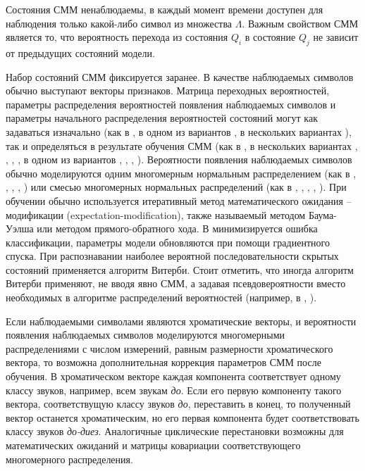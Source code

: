Состояния СММ ненаблюдаемы, в каждый момент времени доступен для наблюдения
только какой-либо символ из множества $\Lambda$. Важным свойством СММ является
то, что вероятность перехода из состояния $Q_i$ в состояние $Q_j$ не зависит от
предыдущих состояний модели.

Набор состояний СММ фиксируется заранее. В качестве наблюдаемых символов обычно
выступают векторы признаков. Матрица переходных вероятностей, параметры
распределения вероятностей появления наблюдаемых символов и параметры начального
распределения вероятностей состояний могут как задаваться изначально (как в
\cite{Bello2005}, в одном из вариантов \cite{Papadopoulos2007}, в нескольких
вариантах \cite{Cho2010}), так и определяться в результате обучения СММ (как в
\cite{Burgoyne2007}, в нескольких вариантах \cite{Papadopoulos2007},
 \cite{Mauch2008}, \cite{Khadkevich2009}, \cite{Reed2009}, в одном из вариантов
\cite{Cho2010}, \cite{Jiang2011}, \cite{Khadkevich2011}, \cite{Ni2011}).
Вероятности появления наблюдаемых символов обычно моделируются одним многомерным
нормальным распределением (как в \cite{Sheh2003}, \cite{Bello2005},
\cite{Papadopoulos2007}, \cite{Ni2011}, \cite{Chen2012}) или смесью многомерных
нормальных распределений (как в \cite{Burgoyne2007}, \cite{Khadkevich2009},
\cite{Reed2009}, \cite{Cho2010}, \cite{Khadkevich2011}). При обучении обычно
используется итеративный метод математического ожидания -- модификации
(expectation-modification), также называемый методом Баума-Уэлша или методом
прямого-обратного хода. В \cite{Reed2009} минимизируется ошибка классификации,
параметры модели обновляются при помощи градиентного спуска. При распознавании
наиболее вероятной последовательности скрытых состояний применяется алгоритм
Витерби. Стоит отметить, что иногда алгоритм Витерби применяют, не вводя явно
СММ, а задавая псевдовероятности вместо необходимых в алгоритме распределений
вероятностей (например, в \cite{Cho2011}, \cite{Humphrey2012}).

Если наблюдаемыми символами являются хроматические векторы, и вероятности
появления наблюдаемых символов моделируются многомерными распределениями с
числом измерений, равным размерности хроматического вектора, то возможна
дополнительная коррекция параметров СММ после обучения. В хроматическом векторе
каждая компонента соответствует одному классу звуков, например, всем звукам
\emph{до}. Если его первую компоненту такого вектора, соответствущую классу
звуков \emph{до}, переставить в конец, то полученный вектор останется
хроматическим, но его первая компонента будет соответствовать классу звуков
\emph{до-диез}. Аналогичные циклические перестановки возможны для математических
ожиданий и матрицы ковариации соответствующего многомерного распределения.

